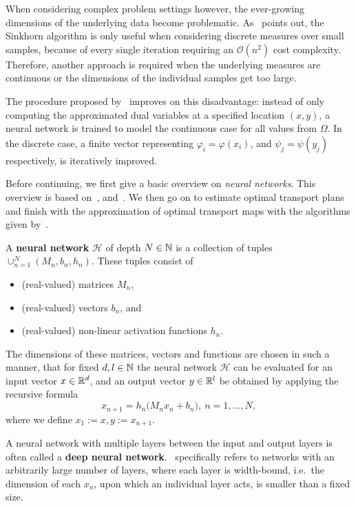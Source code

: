 
When considering complex problem settings however, the ever-growing dimensions of the underlying data become problematic. As\ \cite[Section~1, Large-scale OT]{Seg2018} points out, the Sinkhorn algorithm is only useful when considering discrete measures over small samples, because of every single iteration requiring an $\mathcal{O}(n^2)$ cost complexity. Therefore, another approach is required when the underlying measures are continuous or the dimensions of the individual samples get too large.

The procedure proposed by\ \cite{Seg2018} improves on this disadvantage: instead of only computing the approximated dual variables at a specified location $(x, y)$, a neural network is trained to model the continuous case for all values from $\Omega$. In the discrete case, a finite vector representing $\varphi_i = \varphi(x_i)$, and $\psi_j = \psi(y_j)$ respectively, is iteratively improved.

Before continuing, we first give a basic overview on \textit{neural networks}. This overview is based on\ \cite[Chapter~6]{Good2016}, and\ \cite[Section~6.2]{Brag2020}. We then go on to estimate optimal transport plans and finish with the approximation of optimal transport maps with the algorithms given by\ \cite{Seg2018}.

\begin{definition}
	A \textbf{neural network} $\mathcal{H}$ of depth $\NinN[N]$ is a collection of tuples $\cup_{n = 1}^{N} (M_n, b_n, h_n)$. These tuples consist of
	\begin{itemize}
		\item (real-valued) matrices $M_n$,
		\item (real-valued) vectors $b_n$, and
		\item (real-valued) non-linear activation functions $h_n$.
	\end{itemize}
	The dimensions of these matrices, vectors and functions are chosen in such a manner, that for fixed $\NinN[d, l]$ the neural network $\mathcal{H}$ can be evaluated for an input vector $x \in \R^d$, and an output vector $y \in \R^l$ be obtained by applying the recursive formula
	\[ x_{n + 1} = h_n\big( M_n x_n + b_n \big),\ n = 1, \dots, N, \]
	where we define $x_1 := x, y := x_{n + 1}$.

	A neural network with multiple layers between the input and output layers is often called a \textbf{deep neural network}.\ \cite[p. 135]{Brag2020} specifically refers to networks with an arbitrarily large number of layers, where each layer is width-bound, i.e.\ the dimension of each $x_n$, upon which an individual layer acts, is smaller than a fixed size.
\end{definition}

